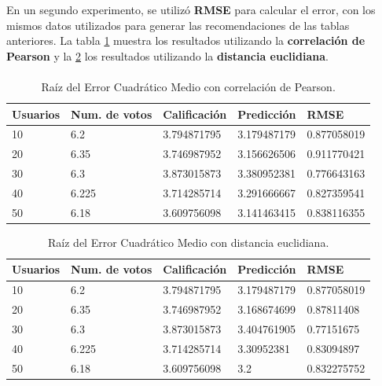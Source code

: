 \documentclass[12pt,letterpaper,oneside] {memoir}
\begin{document}
En un segundo experimento, se utilizó \textbf{RMSE} para calcular el error, con los mismos datos utilizados para generar las recomendaciones de las tablas anteriores. La tabla \ref{tab:RmsdPearson} muestra los resultados utilizando la \textbf{correlación de Pearson} y la \ref{tab:RmsdEuclidiana} los resultados utilizando la \textbf{distancia euclidiana}.
\paragraph*{}
\begin{table}[H]
	\caption{Raíz del Error Cuadrático Medio con correlación de Pearson.} \begin{center}
\linespread{0.9}\selectfont
\begin{tabular}{>{\footnotesize}p{1.0in}>{\footnotesize}p{1.0in}>{\footnotesize}p{1.0in}>{\footnotesize}p{1.0in}>{\footnotesize}p{1.0in}}
\hline                    
Usuarios & Num. de votos & Calificación & Predicción & RMSE\\
\hline             
10 & 6.2 & 3.794871795 & 3.179487179 & 0.877058019\\
20 & 6.35 & 3.746987952 & 3.156626506 & 0.911770421\\
30 & 6.3 & 3.873015873 & 3.380952381 & 0.776643163\\
40 & 6.225 & 3.714285714 & 3.291666667 & 0.827359541\\
50 & 6.18 & 3.609756098 & 3.141463415 & 0.838116355\\
\hline
\end{tabular}
\label{tab:RmsdPearson}
\end{center}
\end{table}


\begin{table}[H]
	\caption{Raíz del Error Cuadrático Medio con distancia euclidiana.} \begin{center}
\linespread{0.9}\selectfont
\begin{tabular}{>{\footnotesize}p{1.0in}>{\footnotesize}p{1.0in}>{\footnotesize}p{1.03in}>{\footnotesize}p{1.0in}>{\footnotesize}p{1.0in}}
\hline                    
Usuarios & Num. de votos & Calificación & Predicción & RMSE\\
\hline             
10 & 6.2 & 3.794871795 & 3.179487179 & 0.877058019\\
20 & 6.35 & 3.746987952 & 3.168674699 & 0.87811408\\
30 & 6.3 & 3.873015873 & 3.404761905 & 0.77151675\\
40 & 6.225 & 3.714285714 & 3.30952381 & 0.83094897\\
50 & 6.18 & 3.609756098 & 3.2 & 0.832275752\\
\hline
\end{tabular}
\label{tab:RmsdEuclidiana}
\end{center}
\end{table}
\end{document}
